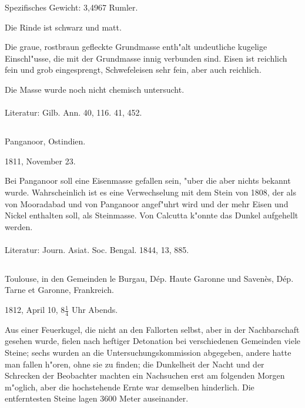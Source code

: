 \documentclass[a4paper, 11pt, oneside]{article}
\begin{document}
Spezifisches Gewicht: 3,4967 Rumler.

Die Rinde ist schwarz und matt.

Die graue, rostbraun gefleckte Grundmasse enth"alt undeutliche kugelige Einschl"usse, die mit der Grundmasse innig verbunden sind. Eisen ist reichlich fein und grob eingesprengt, Schwefeleisen sehr fein, aber auch reichlich.

Die Masse wurde noch nicht chemisch untersucht.
\normalsize
\paragraph{}
Literatur: Gilb. Ann. 40, 116. 41, 452.
\subsection{}
\LARGE
\paragraph{}
Panganoor, Ostindien.

1811, November 23.

Bei Panganoor soll eine Eisenmasse gefallen sein, "uber die aber nichts bekannt wurde. Wahrscheinlich ist es eine Verwechselung mit dem Stein von 1808, der als von Mooradabad und von Panganoor angef"uhrt wird und der mehr Eisen und Nickel enthalten soll, als Steinmasse. Von Calcutta k"onnte das Dunkel aufgehellt werden.
\normalsize
\paragraph{}
Literatur: Journ. Asiat. Soc. Bengal. 1844, 13, 885.
\subsection{}
\LARGE
\paragraph{}
Toulouse, in den Gemeinden le Burgau, Dép. Haute Garonne und Savenès, Dép. Tarne et Garonne, Frankreich.

1812, April 10, $\mathfrak{8\frac{1}{4}}$ Uhr Abends.

Aus einer Feuerkugel, die nicht an den Fallorten selbst, aber in der Nachbarschaft gesehen wurde, fielen nach heftiger Detonation bei verschiedenen Gemeinden viele Steine; sechs wurden an die Untersuchungskommission abgegeben, andere hatte man fallen h"oren, ohne sie zu finden; die Dunkelheit der Nacht und der Schrecken der Beobachter machten ein Nachsuchen erst am folgenden Morgen m"oglich, aber die hochstehende Ernte war demselben hinderlich. Die entferntesten Steine lagen 3600 Meter auseinander.
\end{document}
